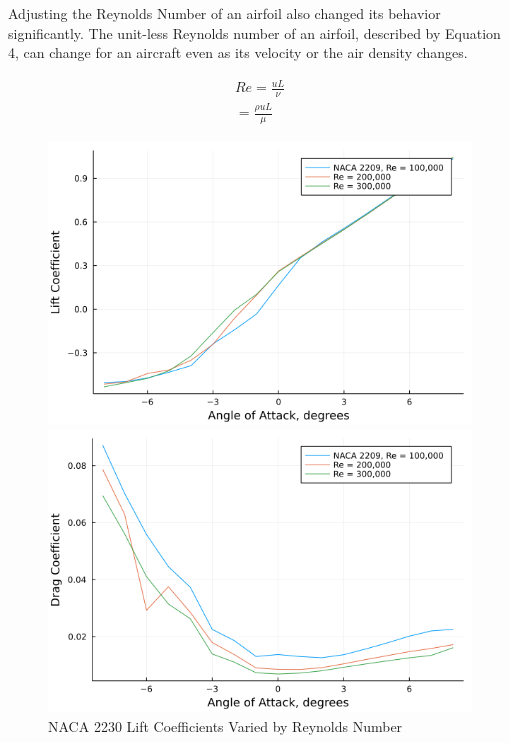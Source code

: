 \documentclass{article}
\begin{document}
Adjusting the Reynolds Number of an airfoil also changed its behavior significantly. The unit-less Reynolds number of an airfoil, described by Equation 4, can change for an aircraft even as its velocity or the air density changes.

\begin{equation} \label{eq:4}
\begin{aligned}
        	Re = \frac{uL}{\nu} \\
	= \frac{\rho uL}{\mu} 
\end{aligned}
\end{equation}
\newline

\begin{figure}[!htb]
  \includegraphics[width=\linewidth]{Figure7.png}
  \caption{NACA 2230 Lift Coefficients Varied by Reynolds Number}\label{fig:7}
\endminipage\hfill
{}
  \includegraphics[width=\linewidth]{Figure8.png}

\end{figure}
\end{document}
